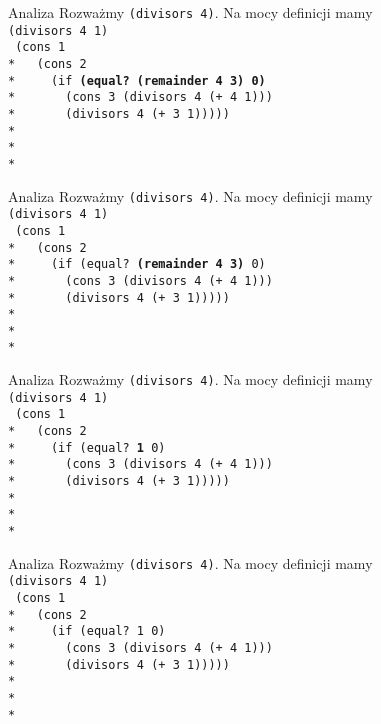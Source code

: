 \begin{frame}{Analiza}
  Rozważmy \texttt{(divisors 4)}. Na mocy definicji mamy\\
  \texttt{(divisors 4 1)}\\
  \texttt{
(cons 1 \\*
\ \ (cons 2 \\*
\ \ \ \ (if \textbf{(equal?\ (remainder 4 3) 0)}\\*
\ \ \ \ \ \ (cons 3 (divisors 4 (+ 4 1)))\\*
\ \ \ \ \ \ (divisors 4 (+ 3 1)))))\\*
\ \\*
\ \\*
  }
\end{frame}

\begin{frame}{Analiza}
  Rozważmy \texttt{(divisors 4)}. Na mocy definicji mamy\\
  \texttt{(divisors 4 1)}\\
  \texttt{
(cons 1 \\*
\ \ (cons 2 \\*
\ \ \ \ (if (equal?\ \textbf{(remainder 4 3)} 0)\\*
\ \ \ \ \ \ (cons 3 (divisors 4 (+ 4 1)))\\*
\ \ \ \ \ \ (divisors 4 (+ 3 1)))))\\*
\ \\*
\ \\*
  }
\end{frame}


\begin{frame}{Analiza}
  Rozważmy \texttt{(divisors 4)}. Na mocy definicji mamy\\
  \texttt{(divisors 4 1)}\\
  \texttt{
(cons 1 \\*
\ \ (cons 2 \\*
\ \ \ \ (if (equal?\ \textbf{1} 0)\\*
\ \ \ \ \ \ (cons 3 (divisors 4 (+ 4 1)))\\*
\ \ \ \ \ \ (divisors 4 (+ 3 1)))))\\*
\ \\*
\ \\*
  }
\end{frame}


\begin{frame}{Analiza}
  Rozważmy \texttt{(divisors 4)}. Na mocy definicji mamy\\
  \texttt{(divisors 4 1)}\\
  \texttt{
(cons 1 \\*
\ \ (cons 2 \\*
\ \ \ \ (if \texttt{(equal?\ 1 0)}\\*
\ \ \ \ \ \ (cons 3 (divisors 4 (+ 4 1)))\\*
\ \ \ \ \ \ (divisors 4 (+ 3 1)))))\\*
\ \\*
\ \\*
  }
\end{frame}

